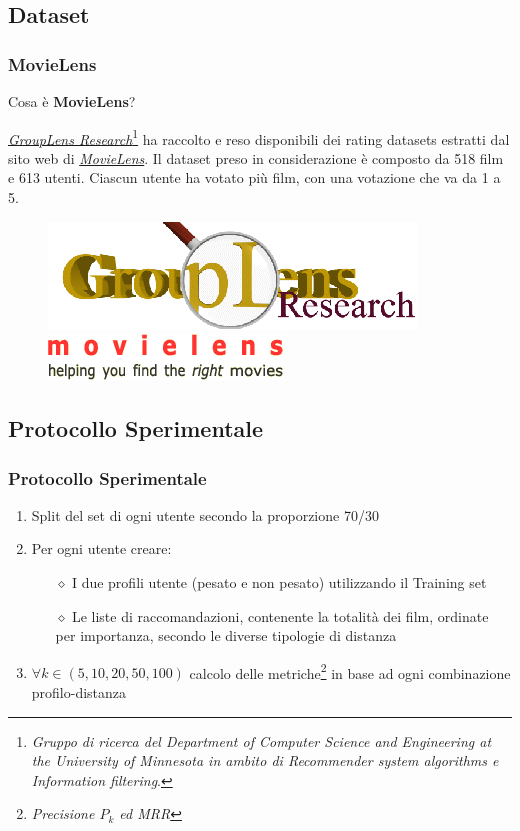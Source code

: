 \documentclass{beamer}
\begin{document}
\subsection{Dataset}
\begin{frame}
\frametitle{MovieLens}
Cosa è \textbf{MovieLens}? \\ \vspace{0.5cm}

\href{http://www.grouplens.org/}{\emph{GroupLens Research}}\footnote{\tiny \emph{Gruppo di ricerca del Department of Computer Science and Engineering at the University of Minnesota in ambito di Recommender system algorithms e Information filtering}.} ha raccolto e reso disponibili dei rating datasets estratti dal sito web di \href{http://movielens.umn.edu}{\emph{MovieLens}}.
Il dataset preso in considerazione è composto da 518 film e 613 utenti. Ciascun utente ha votato più film, con una votazione che va da 1 a 5. 
\begin{figure}
	\includegraphics[width=.3\textwidth]{figure/gl-logo} ~~~~ 
	\includegraphics[width=.3\textwidth]{figure/movielens-helping}
\end{figure}
\end{frame}

\subsection{Protocollo Sperimentale}


\begin{frame}
\frametitle{Protocollo Sperimentale}
\begin{enumerate}
	\setlength{\itemsep}{10pt}
	\item<1-> Split del set di ogni utente secondo la proporzione 70/30
	\item<2-> Per ogni utente creare:
	\begin{itemize}
		\setlength{\itemsep}{6pt}
		\item[$\diamond$] I due profili utente (pesato e non pesato) utilizzando il Training set
		\item[$\diamond$] Le liste di raccomandazioni, contenente la totalità dei film, ordinate per importanza, secondo le diverse tipologie di distanza
	\end{itemize}
	\item<3-> $\forall k \in (5,10,20,50,100)$ calcolo delle metriche\footnote{\footnotesize{\emph{Precisione $P_k$ ed MRR}}} in base ad ogni combinazione profilo-distanza
\end{enumerate}
\end{frame}
\end{document}
